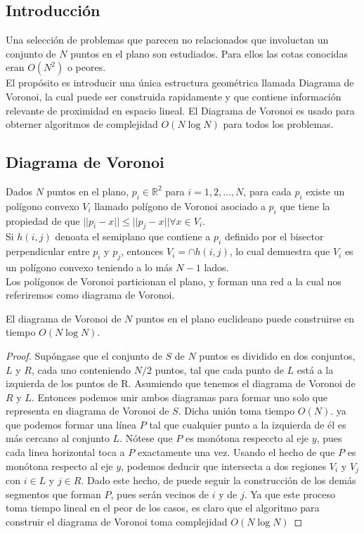 \subsection{Introducción}
Una selección de problemas que parecen no relacionados que involuctan un conjunto de $N$ puntos en el plano son estudiados. Para ellos las cotas conocidas eran $O(N^2)$ o peores. \\
El propósito es introducir una única estructura geométrica llamada Diagrama de Voronoi, la cual puede ser construida rapidamente y que contiene información relevante de proximidad en espacio lineal. El Diagrama de Voronoi es usado para obterner algoritmos de complejidad $O(N \log N)$ para todos los problemas.

\subsection{Diagrama de Voronoi}
Dados $N$ puntos en el plano, $p_i \in \mathbb{R} ^2 $ para $i=1,2,...,N$, para cada $p_i$ existe un polígono convexo $V_i$ llamado polígono de Voronoi asociado a $p_i$ que tiene la propiedad de que $ || p_i - x || \leq || p_j - x|| \forall x \in V_i$. \\
Si $h(i,j)$ denoata el semiplano que contiene a $p_i$ definido por el bisector perpendicular entre $p_i$ y $p_j$, entonces $V_i = \cap h(i,j)$, lo cual demuestra que $V_i$ es un polígono convexo teniendo a lo más $N-1$ lados.\\
Los polígonos de Voronoi particionan el plano, y forman una red a la cual nos referiremos como diagrama de Voronoi.

\begin{theorem}
El diagrama de Voronoi de $N$ puntos en el plano euclideano puede construirse en tiempo $O(N \log N)$.
\end{theorem}

\begin{proof}
Supóngase que el conjunto de $S$ de $N$ puntos es dividido en dos conjuntos, $L$ y $R$, cada uno conteniendo $N/2$ puntos, tal que cada punto de $L$ está a la izquierda de los puntos de R. Asumiendo que tenemos el diagrama de Voronoi de $R$ y $L$. Entonces podemos unir ambos diagramas para formar uno solo que representa en diagrama de Voronoi de $S$. Dicha unión toma tiempo $O(N)$. ya que podemos formar una línea $P$ tal que cualquier punto a la izquierda de él es más cercano al conjunto $L$.  Nótese que $P$ es monótona respeccto al eje $y$, pues cada linea horizontal toca a $P$ exactamente una vez. Usando el hecho de que $P$ es monótona respecto al eje $y$, podemos deducir que intersecta a dos regiones $V_i$ y $V_j$ con $i\in L$ y $j \in R$. Dado este hecho, de puede seguir la construcción de los demás segmentos que forman $P$, pues serán vecinos de $i$ y de $j$. Ya que este proceso toma tiempo lineal en el peor de los casos, es claro que el algoritmo para construir el diagrama de Voronoi toma complejidad $O(N \log N)$
\end{proof}



